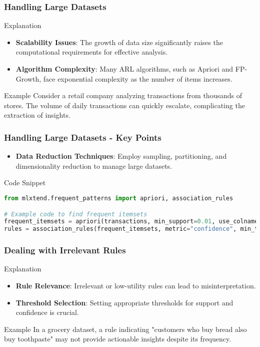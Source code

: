 \documentclass{beamer}
\begin{document}
\begin{frame}[fragile]
    \frametitle{Handling Large Datasets}
    \begin{block}{Explanation}
        \begin{itemize}
            \item \textbf{Scalability Issues}: The growth of data size significantly raises the computational requirements for effective analysis.
            \item \textbf{Algorithm Complexity}: Many ARL algorithms, such as Apriori and FP-Growth, face exponential complexity as the number of items increases.
        \end{itemize}
    \end{block}
    \begin{block}{Example}
        Consider a retail company analyzing transactions from thousands of stores. 
        The volume of daily transactions can quickly escalate, complicating the extraction of insights.
    \end{block}
\end{frame}

\begin{frame}[fragile]
    \frametitle{Handling Large Datasets - Key Points}
    \begin{itemize}
        \item \textbf{Data Reduction Techniques}: Employ sampling, partitioning, and dimensionality reduction to manage large datasets.
    \end{itemize}
    \begin{block}{Code Snippet}
    \begin{lstlisting}[language=Python]
from mlxtend.frequent_patterns import apriori, association_rules

# Example code to find frequent itemsets
frequent_itemsets = apriori(transactions, min_support=0.01, use_colnames=True)
rules = association_rules(frequent_itemsets, metric="confidence", min_threshold=0.5)
    \end{lstlisting}
    \end{block}
\end{frame}

\begin{frame}[fragile]
    \frametitle{Dealing with Irrelevant Rules}
    \begin{block}{Explanation}
        \begin{itemize}
            \item \textbf{Rule Relevance}: Irrelevant or low-utility rules can lead to misinterpretation.
            \item \textbf{Threshold Selection}: Setting appropriate thresholds for support and confidence is crucial.
        \end{itemize}
    \end{block}
    \begin{block}{Example}
        In a grocery dataset, a rule indicating "customers who buy bread also buy toothpaste" may not provide actionable insights despite its frequency.
    \end{block}
\end{frame}
\end{document}
